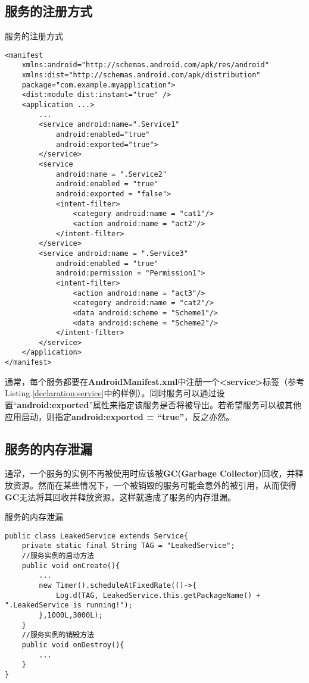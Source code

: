 \subsection{服务的注册方式}
\begin{listing}[htbp]
	\centering
	\caption{服务的注册方式}
	\begin{verbatim}
<manifest
	xmlns:android="http://schemas.android.com/apk/res/android"
	xmlns:dist="http://schemas.android.com/apk/distribution"
	package="com.example.myapplication">
	<dist:module dist:instant="true" />
	<application ...>
		...
		<service android:name=".Service1"
			android:enabled="true"
			android:exported="true">
		</service>
		<service
			android:name = ".Service2"
			android:enabled = "true"
			android:exported = "false">
			<intent-filter>
				<category android:name = "cat1"/>
				<action android:name = "act2"/>
			</intent-filter>
		</service>
		<service android:name = ".Service3"
			android:enabled = "true"
			android:permission = "Permission1">
			<intent-filter>
				<action android:name = "act3"/>
				<category android:name = "cat2"/>
				<data android:scheme = "Scheme1"/>
				<data android:scheme = "Scheme2"/>
			</intent-filter>
		</service>
	</application>
</manifest>
	\end{verbatim}
	\label{declaration:service}
\end{listing}
通常，每个服务都要在\textbf{AndroidManifest.xml}中注册一个\textbf{<service>}标签（参考Listing.\textcolor{red}{\ref{declaration:service}}中的样例）。同时服务可以通过设置“\textbf{android:exported}”属性来指定该服务是否将被导出。若希望服务可以被其他应用启动，则指定\textbf{android:exported = “true”}，反之亦然。
%
%
%
%
%
%
%
%
\subsection{服务的内存泄漏}\label{service_leak}
通常，一个服务的实例不再被使用时应该被\textbf{GC(Garbage Collector)}回收，并释放资源。然而在某些情况下，一个被销毁的服务可能会意外的被引用，从而使得\textbf{GC}无法将其回收并释放资源，这样就造成了服务的内存泄漏。
\begin{listing}[htbp]
	\centering
	\caption{服务的内存泄漏}
	\begin{verbatim}
public class LeakedService extends Service{
	private static final String TAG = "LeakedService";
	//服务实例的启动方法
	public void onCreate(){
		...
		new Timer().scheduleAtFixedRate(()->{
			Log.d(TAG, LeakedService.this.getPackageName() + ".LeakedService is running!");
		},1000L,3000L);
	}
	//服务实例的销毁方法
	public void onDestroy(){
		...
	}
}
	\end{verbatim}
	\label{leaked example:service}
\end{listing}

